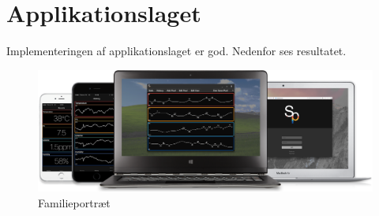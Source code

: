\section{Applikationslaget}
Implementeringen af applikationslaget er god. Nedenfor ses resultatet.

\begin{figure}
	\centering
	\includegraphics[width=1.0\linewidth]{figs/implementering/view_family}
	\caption{Familieportræt}
	\label{fig:view_family}
\end{figure}